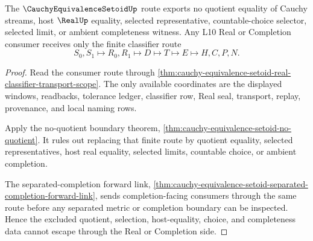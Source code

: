 \begin{theorem}
\label{thm:cauchy-equivalence-setoid-quotient-boundary-nonescape}
The $\CauchyEquivalenceSetoidUp$ route exports no quotient equality of Cauchy streams, host $\RealUp$ equality, selected representative, countable-choice selector, selected limit, or ambient completeness witness. Any L10 Real or Completion consumer receives only the finite classifier route
$$
S_0,S_1 \longmapsto R_0,R_1 \longmapsto D \longmapsto T \longmapsto E \longmapsto H,C,P,N .
$$
\end{theorem}
\begin{proof}
Read the consumer route through \autoref{thm:cauchy-equivalence-setoid-real-classifier-transport-scope}. The only available coordinates are the displayed windows, readbacks, tolerance ledger, classifier row, Real seal, transport, replay, provenance, and local naming rows.

Apply the no-quotient boundary theorem, \autoref{thm:cauchy-equivalence-setoid-no-quotient}. It rules out replacing that finite route by quotient equality, selected representatives, host real equality, selected limits, countable choice, or ambient completion.

The separated-completion forward link, \autoref{thm:cauchy-equivalence-setoid-separated-completion-forward-link}, sends completion-facing consumers through the same route before any separated metric or completion boundary can be inspected. Hence the excluded quotient, selection, host-equality, choice, and completeness data cannot escape through the Real or Completion side.
\end{proof}

